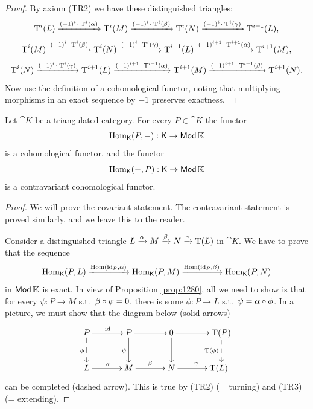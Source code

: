 \begin{proof}
By axiom (TR2) we have these distinguished triangles:
\[ \operatorname{T}^i(L) \xrightarrow{(-1)^{i} \mspace{1.5mu}{\cdot}\mspace{1.5mu} \operatorname{T}^i(\alpha)} \operatorname{T}^i(M) 
\xrightarrow{(-1)^{i} \mspace{1.5mu}{\cdot}\mspace{1.5mu} \operatorname{T}^i(\beta)} \operatorname{T}^i(N) 
\xrightarrow{(-1)^{i} \mspace{1.5mu}{\cdot}\mspace{1.5mu} \operatorname{T}^i(\gamma)} \operatorname{T}^{i + 1}(L) , \]
\[ \operatorname{T}^i(M) \xrightarrow{(-1)^{i} \mspace{1.5mu}{\cdot}\mspace{1.5mu} \operatorname{T}^i(\beta)} \operatorname{T}^i(N) 
\xrightarrow{(-1)^{i} \mspace{1.5mu}{\cdot}\mspace{1.5mu} \operatorname{T}^i(\gamma)} \operatorname{T}^{i + 1}(L) 
\xrightarrow{(-1)^{i+1} \mspace{1.5mu}{\cdot}\mspace{1.5mu} \operatorname{T}^{i + 1}(\alpha)} \operatorname{T}^{i + 1}(M) , \]
\[ \operatorname{T}^{i}(N) \xrightarrow{(-1)^{i} \mspace{1.5mu}{\cdot}\mspace{1.5mu} \operatorname{T}^{i}(\gamma)} 
\operatorname{T}^{i + 1}(L) \xrightarrow{(-1)^{i+1} \mspace{1.5mu}{\cdot}\mspace{1.5mu} \operatorname{T}^{i + 1}(\alpha)} 
\operatorname{T}^{i + 1}(M) \xrightarrow{(-1)^{i+1} \mspace{1.5mu}{\cdot}\mspace{1.5mu} 
\operatorname{T}^{i + 1}(\beta)} \operatorname{T}^{i + 1}(N) . \]
Now use the definition of a cohomological functor, noting that multiplying 
morphisms in an exact sequence by $-1$ preserves exactness.
\end{proof}

\begin{prop} \label{prop:4}
Let $\cat{K}$ be a triangulated category.
For every $P \in \cat{K}$ the functor
\[ \operatorname{Hom}_{\operatorname{\mathsf{K}}}(P, -) : \operatorname{\mathsf{K}} \to \operatorname{\mathsf{Mod}} \mathbb{K} \]
is a cohomological functor, and the functor 
\[ \operatorname{Hom}_{\operatorname{\mathsf{K}}}(-, P) : \operatorname{\mathsf{K}} \to \operatorname{\mathsf{Mod}} \mathbb{K} \]
is a contravariant cohomological functor. 
\end{prop}

\begin{proof}
We will prove the covariant statement. The contravariant statement is 
proved similarly, and we leave this to the reader. 

Consider a distinguished triangle 
$L \xrightarrow{\alpha} M \xrightarrow{\beta} N \xrightarrow{\gamma} \operatorname{T}(L)$
in $\cat{K}$. We have to prove that the sequence 
\[ \operatorname{Hom}_{\operatorname{\mathsf{K}}}(P, L) \xrightarrow{ \operatorname{Hom}(\operatorname{id}_P, \alpha) } 
\operatorname{Hom}_{\operatorname{\mathsf{K}}}(P, M) \xrightarrow{ \operatorname{Hom}(\operatorname{id}_P, \beta) } 
\operatorname{Hom}_{\operatorname{\mathsf{K}}}(P, N)  \]
in $\operatorname{\mathsf{Mod}} \mathbb{K}$ is exact. In view of Proposition \ref{prop:1280}, all we need 
to show is that for every $\psi : P \to M$ s.t.\ $\beta \circ \psi = 0$, there is 
some  $\phi : P \to L$ s.t.\ $\psi = \alpha \circ \phi$.  In a picture, we must 
show that the diagram below (solid arrows) 
\[ \UseTips  \xymatrix @C=8ex @R=6ex { 
P
\ar[r]^{\opn{id}}
\ar@{-->}[d]_{\phi}
&
P
\ar[r]^{}
\ar[d]_{\psi}
& 
0
\ar[r]^{}
\ar[d]_{}
&
\opn{T}(P)
\ar@{-->}[d]_{\opn{T}(\phi)}
\\
L
\ar[r]^{\al}
&
M
\ar[r]^{\be}
& 
N
\ar[r]^{\ga}
&
\opn{T}(L) \ .
}  \]
can be completed (dashed arrow). 
This is true by (TR2) (= turning) and (TR3) (= extending). 
\end{proof}


